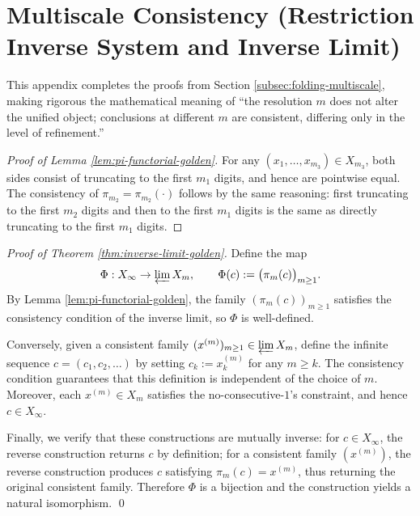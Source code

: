 \section{Multiscale Consistency (Restriction Inverse System and Inverse Limit)}\label{app:multiscale-inverse-limit}

This appendix completes the proofs from Section \ref{subsec:folding-multiscale}, making rigorous the mathematical meaning of ``the resolution $m$ does not alter the unified object; conclusions at different $m$ are consistent, differing only in the level of refinement.''

\begin{proof}[Proof of Lemma \ref{lem:pi-functorial-golden}]
For any $(x_1,\dots,x_{m_3})\in X_{m_3}$, both sides consist of truncating to the first $m_1$ digits, and hence are pointwise equal. The consistency of $\pi_{m_2}=\pi_{m_2}(\cdot)$ follows by the same reasoning: first truncating to the first $m_2$ digits and then to the first $m_1$ digits is the same as directly truncating to the first $m_1$ digits.
\end{proof}

\begin{proof}[Proof of Theorem \ref{thm:inverse-limit-golden}]
Define the map
\[
\Phi:X_\infty\to \varprojlim X_m,\qquad
\Phi(c):=\bigl(\pi_m(c)\bigr)_{m\ge 1}.
\]
By Lemma \ref{lem:pi-functorial-golden}, the family $(\pi_m(c))_{m\ge 1}$ satisfies the consistency condition of the inverse limit, so $\Phi$ is well-defined.

Conversely, given a consistent family $(x^{(m)})_{m\ge 1}\in\varprojlim X_m$, define the infinite sequence $c=(c_1,c_2,\dots)$ by setting $c_k:=x^{(m)}_k$ for any $m\ge k$. The consistency condition guarantees that this definition is independent of the choice of $m$. Moreover, each $x^{(m)}\in X_m$ satisfies the no-consecutive-$1$'s constraint, and hence $c\in X_\infty$.

Finally, we verify that these constructions are mutually inverse: for $c\in X_\infty$, the reverse construction returns $c$ by definition; for a consistent family $(x^{(m)})$, the reverse construction produces $c$ satisfying $\pi_m(c)=x^{(m)}$, thus returning the original consistent family. Therefore $\Phi$ is a bijection and the construction yields a natural isomorphism. \qed
\end{proof}

